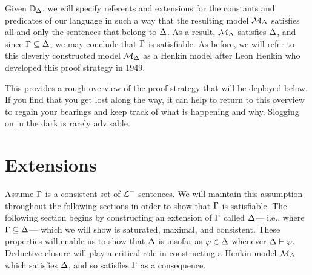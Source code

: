Given $\mathbb{D}_{\Delta}$, we will specify referents and extensions for the constants and predicates of our language in such a way that the resulting model $\mathcal{M}_{\Delta}$ satisfies all and only the sentences that belong to $\Delta$.
As a result, $\mathcal{M}_{\Delta}$ satisfies $\Delta$, and since $\Gamma\subseteq\Delta$, we may conclude that $\Gamma$ is satisfiable. 
As before, we will refer to this cleverly constructed model $\mathcal{M}_{\Delta}$ as a Henkin model after Leon Henkin who developed this proof strategy in 1949.

This provides a rough overview of the proof strategy that will be deployed below.
If you find that you get lost along the way, it can help to return to this overview to regain your bearings and keep track of what is happening and why.
Slogging on in the dark is rarely advisable.







\section{Extensions}%
  \label{sec:Extensions}

Assume $\Gamma$ is a consistent set of $\mathcal{L}^{=}$ sentences.
We will maintain this assumption throughout the following sections in order to show that $\Gamma$ is satisfiable. 
The following section begins by constructing an extension of $\Gamma$ called $\Delta$--- i.e., where $\Gamma \subseteq \Delta$---  which we will show is saturated, maximal, and consistent.
These properties will enable us to show that $\Delta$ is  insofar as $\varphi\in\Delta$ whenever $\Delta\vdash\varphi$. 
Deductive closure will play a critical role in constructing a Henkin model $\mathcal{M}_{\Delta}$ which satisfies $\Delta$, and so satisfies $\Gamma$ as a consequence. 





